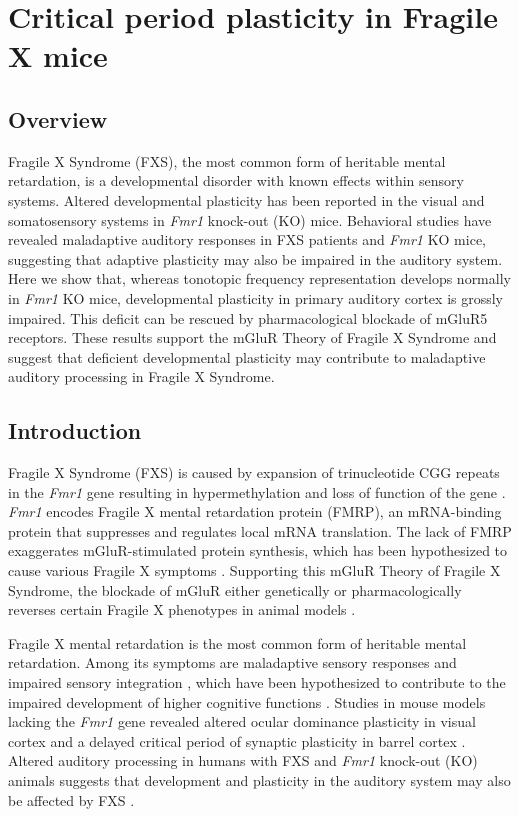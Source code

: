 \chapter{Critical period plasticity in Fragile X mice}

\section{Overview}
\newrefsection

Fragile X Syndrome (FXS), the most common form of heritable mental retardation, is a developmental disorder with known effects within sensory systems. Altered developmental plasticity has been reported in the visual and somatosensory systems in \textit{Fmr1} knock-out (KO) mice. Behavioral studies have revealed maladaptive auditory responses in FXS patients and \textit{Fmr1} KO mice, suggesting that adaptive plasticity may also be impaired in the auditory system. Here we show that, whereas tonotopic frequency representation develops normally in \textit{Fmr1} KO mice, developmental plasticity in primary auditory cortex is grossly impaired. This deficit can be rescued by pharmacological blockade of mGluR5 receptors. These results support the mGluR Theory of Fragile X Syndrome and suggest that deficient developmental plasticity may contribute to maladaptive auditory processing in Fragile X Syndrome.

\section{Introduction}

Fragile X Syndrome (FXS) is caused by expansion of trinucleotide CGG repeats in the \textit{Fmr1} gene resulting in hypermethylation and loss of function of the gene \cite{Jin2003}. \textit{Fmr1} encodes Fragile X mental retardation protein (FMRP), an mRNA-binding protein that suppresses and regulates local mRNA translation. The lack of FMRP exaggerates mGluR-stimulated protein synthesis, which has been hypothesized to cause various Fragile X symptoms \cite{Bear2004, Osterweil2010}. Supporting this mGluR Theory of Fragile X Syndrome, the blockade of mGluR either genetically or pharmacologically reverses certain Fragile X phenotypes in animal models \cite{McBride2005, Yan2005, Dolen2007, DeVrij2008, Meredith2011, Su2011, Michalon2012, Thomas2012}.

Fragile X mental retardation is the most common form of heritable mental retardation. Among its symptoms are maladaptive sensory responses and impaired sensory integration \cite{Miller1999, Chen2001, Nielsen2002}, which have been hypothesized to contribute to the impaired development of higher cognitive functions \cite{Hanson, Leblanc2011}. Studies in mouse models lacking the \textit{Fmr1} gene revealed altered ocular dominance plasticity in visual cortex and a delayed critical period of synaptic plasticity in barrel cortex \cite{Dolen2007, Harlow2010a}. Altered auditory processing in humans with FXS and \textit{Fmr1} knock-out (KO) animals suggests that development and plasticity in the auditory system may also be affected by FXS \cite{Miller1999, Chen2001, Nielsen2002}.

